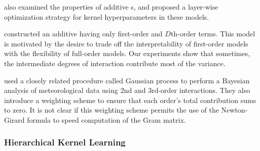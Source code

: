 \citet{durrande2011additive} also examined the properties of additive \gp{}s, and proposed a layer-wise optimization strategy for kernel hyperparameters in these models.

\citet{plate1999accuracy} constructed an additive \gp{} having only first-order and $D$th-order terms.
This model is motivated by the desire to trade off the interpretability of first-order models with the flexibility of full-order models.
Our experiments show that sometimes, the intermediate degrees of interaction contribute most of the variance.

\citet{kaufman2010bayesian} used a closely related procedure called Gaussian process \ANOVA{} to perform a Bayesian analysis of meteorological data using 2nd and 3rd-order interactions.
They also introduce a weighting scheme to ensure that each order's total contribution sums to zero.
It is not clear if this weighting scheme permits the use of the Newton-Girard formula to speed computation of the Gram matrix.


\subsubsection{Hierarchical Kernel Learning}

